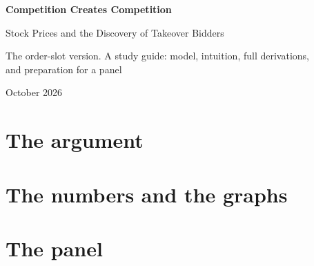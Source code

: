 \documentclass[11pt]{article}
\begin{document}
\begin{titlepage}
\centering
{\LARGE\bfseries Competition Creates Competition\par}
\vspace{0.4em}
{\large Stock Prices and the Discovery of Takeover Bidders\par}
\vspace{2em}
{\large The order-slot version. A study guide: model, intuition, full derivations,\\ and preparation for a panel\par}
\vspace{3em}

\vfill
{\large October 2026\par}
\end{titlepage}

\tableofcontents
\clearpage

\part{The argument}








\part{The numbers and the graphs}







\part{The panel}


\appendix



\end{document}
